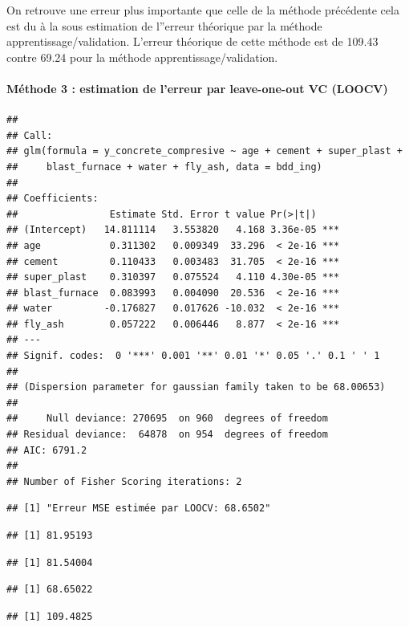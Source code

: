 \documentclass[
  12pt,
]{article}
\begin{document}
On retrouve une erreur plus importante que celle de la méthode
précédente cela est du à la sous estimation de l''erreur théorique par
la méthode apprentissage/validation. L'erreur théorique de cette méthode
est de 109.43 contre 69.24 pour la méthode apprentissage/validation.

\paragraph{Méthode 3 : estimation de l'erreur par leave-one-out VC
(LOOCV)}\label{muxe9thode-3-estimation-de-lerreur-par-leave-one-out-vc-loocv}

\begin{verbatim}
## 
## Call:
## glm(formula = y_concrete_compresive ~ age + cement + super_plast + 
##     blast_furnace + water + fly_ash, data = bdd_ing)
## 
## Coefficients:
##                Estimate Std. Error t value Pr(>|t|)    
## (Intercept)   14.811114   3.553820   4.168 3.36e-05 ***
## age            0.311302   0.009349  33.296  < 2e-16 ***
## cement         0.110433   0.003483  31.705  < 2e-16 ***
## super_plast    0.310397   0.075524   4.110 4.30e-05 ***
## blast_furnace  0.083993   0.004090  20.536  < 2e-16 ***
## water         -0.176827   0.017626 -10.032  < 2e-16 ***
## fly_ash        0.057222   0.006446   8.877  < 2e-16 ***
## ---
## Signif. codes:  0 '***' 0.001 '**' 0.01 '*' 0.05 '.' 0.1 ' ' 1
## 
## (Dispersion parameter for gaussian family taken to be 68.00653)
## 
##     Null deviance: 270695  on 960  degrees of freedom
## Residual deviance:  64878  on 954  degrees of freedom
## AIC: 6791.2
## 
## Number of Fisher Scoring iterations: 2
\end{verbatim}

\begin{verbatim}
## [1] "Erreur MSE estimée par LOOCV: 68.6502"
\end{verbatim}

\begin{verbatim}
## [1] 81.95193
\end{verbatim}

\begin{verbatim}
## [1] 81.54004
\end{verbatim}

\begin{verbatim}
## [1] 68.65022
\end{verbatim}

\begin{verbatim}
## [1] 109.4825
\end{verbatim}
\end{document}
